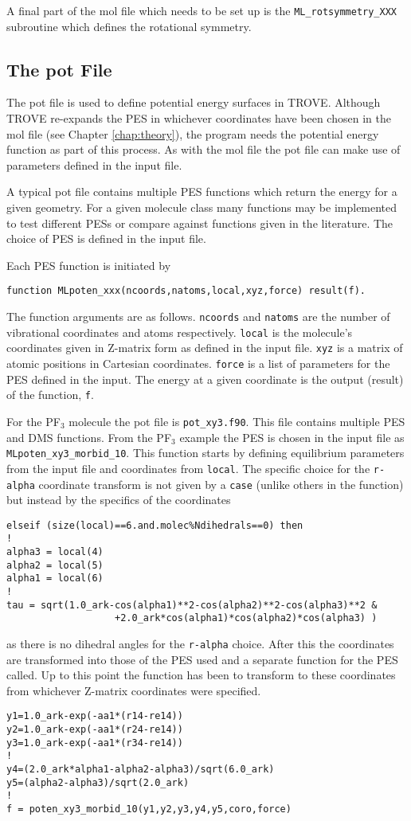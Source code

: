 A final part of the mol file which needs to be set up is the \verb|ML_rotsymmetry_XXX| subroutine which defines
the rotational symmetry.

\subsection{The pot File}

The pot file is used to define potential energy surfaces in TROVE. Although TROVE re-expands the PES in whichever 
coordinates have been chosen in the mol file (see Chapter \ref{chap:theory}), the program needs the potential energy function as part 
of this process. As with the mol file the pot file can make use of parameters defined in the input file.

A typical pot file contains multiple PES functions which return the energy for a given geometry. For a given molecule
class many functions may be implemented to test different PESs or compare against functions given 
in the literature. The choice of PES is defined in the input file.

Each PES function is initiated by 
\begin{verbatim}
function MLpoten_xxx(ncoords,natoms,local,xyz,force) result(f). 
\end{verbatim}
The function
arguments are as follows. \verb|ncoords| and \verb|natoms| are the number of vibrational coordinates and atoms respectively.
\verb|local| is the molecule's coordinates given in Z-matrix form as defined in the input file. \verb|xyz| is a matrix
of atomic positions in Cartesian coordinates. \verb|force| is a list of parameters for the PES defined in the input. The
energy at a given coordinate is the output (result) of the function, \verb|f|.  

For the PF$_3$ molecule the pot file is \verb|pot_xy3.f90|. This file contains multiple PES and DMS functions. From the PF$_3$
example the PES is chosen in the input file as \verb| MLpoten_xy3_morbid_10|. This function starts by defining equilibrium
parameters from the input file and coordinates from \verb|local|. The specific choice for the \verb|r-alpha| coordinate
transform is not given by a \verb|case| (unlike others in the function) but instead by the specifics of the coordinates
\begin{verbatim}
elseif (size(local)==6.and.molec%Ndihedrals==0) then
!
alpha3 = local(4)
alpha2 = local(5)
alpha1 = local(6)
!
tau = sqrt(1.0_ark-cos(alpha1)**2-cos(alpha2)**2-cos(alpha3)**2 &
                   +2.0_ark*cos(alpha1)*cos(alpha2)*cos(alpha3) )
\end{verbatim}
as there is no dihedral angles for the \verb|r-alpha| choice. After this the coordinates are transformed into those of the
PES used and a separate function for the PES called. Up to this point the function has been to transform to these coordinates
from whichever Z-matrix coordinates were specified.
\begin{verbatim}
y1=1.0_ark-exp(-aa1*(r14-re14))
y2=1.0_ark-exp(-aa1*(r24-re14))
y3=1.0_ark-exp(-aa1*(r34-re14))
!
y4=(2.0_ark*alpha1-alpha2-alpha3)/sqrt(6.0_ark)
y5=(alpha2-alpha3)/sqrt(2.0_ark)
!
f = poten_xy3_morbid_10(y1,y2,y3,y4,y5,coro,force)
\end{verbatim}

